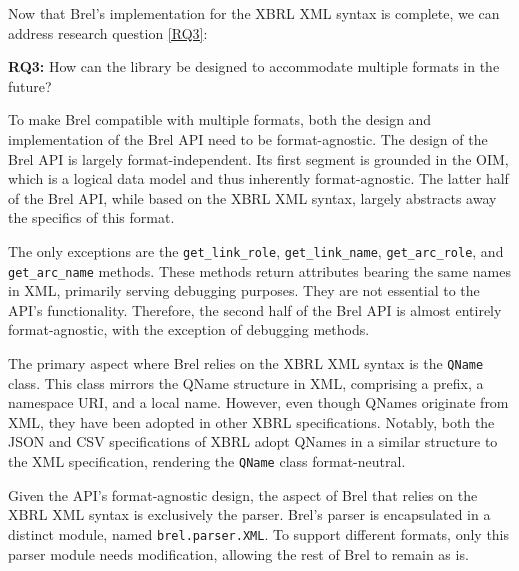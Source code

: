 Now that Brel's implementation for the XBRL XML syntax is complete, we can address research question \ref{RQ3}:

\begin{displayquote}
    \textbf{RQ3:} How can the library be designed to accommodate multiple formats in the future?
\end{displayquote}

To make Brel compatible with multiple formats, both the design and implementation of the Brel API need to be format-agnostic. 
The design of the Brel API is largely format-independent. 
Its first segment is grounded in the OIM, which is a logical data model and thus inherently format-agnostic.
The latter half of the Brel API, while based on the XBRL XML syntax, largely abstracts away the specifics of this format. 

The only exceptions are the \texttt{get\_link\_role}, \texttt{get\_link\_name}, \texttt{get\_arc\_role}, and \texttt{get\_arc\_name} methods.
These methods return attributes bearing the same names in XML, primarily serving debugging purposes.
They are not essential to the API's functionality.
Therefore, the second half of the Brel API is almost entirely format-agnostic, with the exception of debugging methods.

The primary aspect where Brel relies on the XBRL XML syntax is the \texttt{QName} class.
This class mirrors the QName structure in XML, comprising a prefix, a namespace URI, and a local name. 
However, even though QNames originate from XML, they have been adopted in other XBRL specifications.
Notably, both the JSON\cite{xbrl_json} and CSV\cite{xbrl_csv} specifications of XBRL adopt QNames in a similar structure to the XML specification, 
rendering the \texttt{QName} class format-neutral.

Given the API's format-agnostic design, the aspect of Brel that relies on the XBRL XML syntax is exclusively the parser. 
Brel's parser is encapsulated in a distinct module, named \texttt{brel.parser.XML}. 
To support different formats, only this parser module needs modification, allowing the rest of Brel to remain as is.
